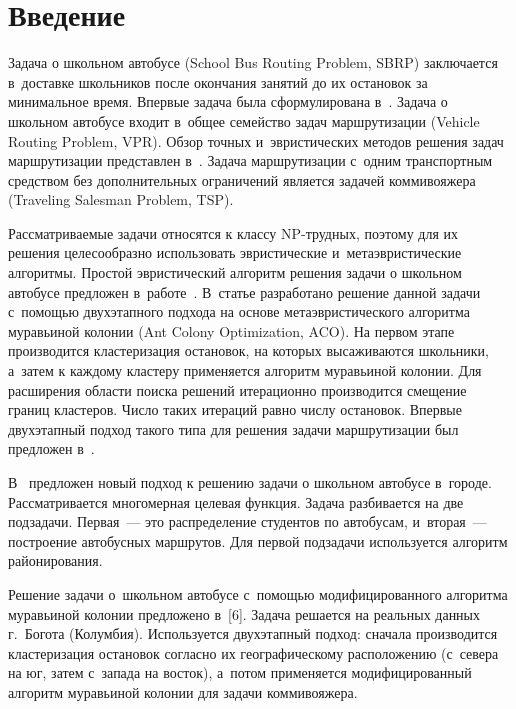 \begin{multicols}{2}

\label{st\stat}

\section{Введение}

     Задача о школьном автобусе (School Bus Routing Problem, SBRP)
заключается в~доставке школьников после окончания занятий до их остановок
за минимальное время. Впервые задача была сформулирована в~\cite{1-va}.
Задача о школьном автобусе входит в~общее семейство задач маршрутизации\linebreak
(Vehicle Routing Problem, VPR). Обзор точных и~эвристических методов
решения задач маршрутизации пред\-став\-лен в~\cite{2-va}. Задача маршрутизации с~одним транспортным средством без дополнительных ограничений является
задачей коммивояжера (Traveling Salesman Problem, TSP).

   Рассматриваемые задачи относятся к классу NP-труд\-ных, поэтому для их
решения целесообразно использовать эвристические и~метаэвристические
алгоритмы. Простой эвристический алгоритм решения задачи о школьном
автобусе предложен в~работе~\cite{3-va}. В~статье разработано решение
данной задачи с~помощью двухэтапного подхода на основе метаэвристического
алгоритма муравьиной колонии (Ant Colony Optimization, ACO). На первом
этапе производится кластеризация остановок, на которых высаживаются
школьники, а~затем к каж\-до\-му кластеру применяется алгоритм муравьиной
колонии. Для расширения области поиска решений итерационно производится
смещение границ кластеров. Число таких итераций равно числу остановок.
Впервые двухэтапный подход такого типа для решения задачи маршрутизации
был предложен в~\cite{4-va}.

     В~\cite{5-va} предложен новый подход к решению задачи о школьном
автобусе в~городе. Рассматривается многомерная целевая функция. Задача
разбивается на две подзадачи. Первая~--- это распределение студентов по
автобусам, и~вторая~--- построение автобусных маршрутов. Для первой
подзадачи используется алгоритм районирования.

     Решение задачи о~школьном автобусе с~по\-мощью модифицированного
алгоритма муравьиной колонии предложено в~[6]. Задача решается на
реальных данных г.~Богота (Колумбия). Используется двухэтапный подход:
сначала производится кластеризация остановок согласно их географическому
расположению (с~севера на юг, затем с~запада на восток), а~потом применяется
модифицированный алгоритм муравьиной колонии для задачи коммивояжера.


\end{multicols}
